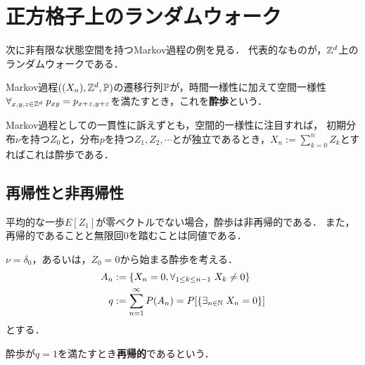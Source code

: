 \documentclass[uplatex,dvipdfmx]{jsreport}
\begin{document}
\section{正方格子上のランダムウォーク}

\begin{tcolorbox}[colframe=ForestGreen, colback=ForestGreen!10!white,breakable,colbacktitle=ForestGreen!40!white,coltitle=black,fonttitle=\bfseries\sffamily,
title=]
    次に非有限な状態空間を持つMarkov過程の例を見る．
    代表的なものが，$\mathbb{Z}^d$上のランダムウォークである．
\end{tcolorbox}

\begin{definition}
    Markov過程$((X_n),\mathbb{Z}^d,\mathbb{P})$の遷移行列$\mathbb{P}$が，時間一様性に加えて空間一様性$\forall_{x,y,z\in\mathbb{Z}^d}\;p_{xy}=p_{x+z,y+z}$を満たすとき，これを\textbf{酔歩}という．
\end{definition}

\begin{discussion}[加法過程としての構成]\label{discussion-random-walk}
    Markov過程としての一貫性に訴えずとも，空間的一様性に注目すれば，
    初期分布$\nu$を持つ$Z_0$と，分布$p$を持つ$Z_1,Z_2,\cdots$とが独立であるとき，$X_n:=\sum^n_{k=0}Z_k$とすればこれは酔歩である．
\end{discussion}

\subsection{再帰性と非再帰性}

\begin{tcolorbox}[colframe=ForestGreen, colback=ForestGreen!10!white,breakable,colbacktitle=ForestGreen!40!white,coltitle=black,fonttitle=\bfseries\sffamily,
title=]
    平均的な一歩$E[Z_1]$が零ベクトルでない場合，酔歩は非再帰的である．
    また，再帰的であることと無限回$0$を踏むことは同値である．
\end{tcolorbox}

\begin{notation}
    $\nu=\delta_0$，あるいは，$Z_0=0$から始まる酔歩を考える．
    \begin{align*}
        A_n&:=\left\{X_n=0,\forall_{1\le k\le n-1}\;X_k\ne0\right\}\\
        q&:=\sum^\infty_{n=1}P(A_n)=P[\left\{\exists_{n\in\mathbb{N}}\;X_n=0\right\}]
    \end{align*}
    とする．
\end{notation}

\begin{definition}[recurrent]
    酔歩が$q=1$を満たすとき\textbf{再帰的}であるという．
\end{definition}
\end{document}
